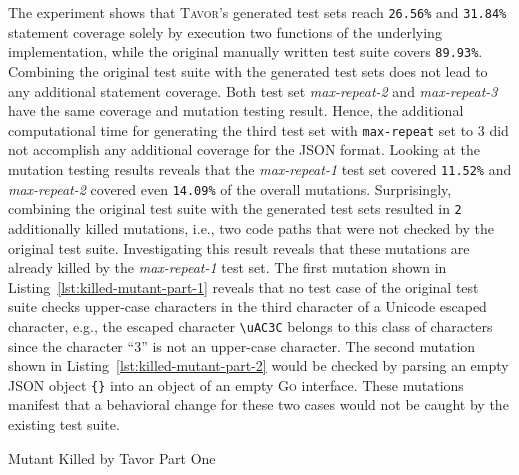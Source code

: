 The experiment shows that \textsc{Tavor}'s generated test sets reach \texttt{26.56\%} and \texttt{31.84\%} statement coverage solely by execution two functions of the underlying implementation, while the original manually written test suite covers \texttt{89.93\%}. Combining the original test suite with the generated test sets does not lead to any additional statement coverage. Both test set \emph{max-repeat-2} and \emph{max-repeat-3} have the same coverage and mutation testing result. Hence, the additional computational time for generating the third test set with \texttt{max-repeat} set to 3 did not accomplish any additional coverage for the JSON format. Looking at the mutation testing results reveals that the \emph{max-repeat-1} test set covered \texttt{11.52\%} and \emph{max-repeat-2} covered even \texttt{14.09\%} of the overall mutations. Surprisingly, combining the original test suite with the generated test sets resulted in \texttt{2} additionally killed mutations, i.e., two code paths that were not checked by the original test suite. Investigating this result reveals that these mutations are already killed by the \emph{max-repeat-1} test set. The first mutation shown in Listing~\ref{lst:killed-mutant-part-1} reveals that no test case of the original test suite checks upper-case characters in the third character of a Unicode escaped character, e.g., the escaped character \texttt{\textbackslash{}uAC3C} belongs to this class of characters since the character \enquote{3} is not an upper-case character. The second mutation shown in Listing~\ref{lst:killed-mutant-part-2} would be checked by parsing an empty JSON object \texttt{\{\}} into an object of an empty \textsc{Go} interface. These mutations manifest that a behavioral change for these two cases would not be caught by the existing test suite.

\begin{listing}[H]
\caption{Mutant Killed by Tavor Part One}
\label{lst:killed-mutant-part-1}
\begin{textcode}
--- /home/symflower/json/json/original/src/json/scanner.go  2017-12-01 18:53:42.663580118 +0100
+++ /tmp/go-mutesting-288106446//home/symflower/json/json/original/src/json/scanner.go.119  2017-12-03 10:43:45.026538957 +0100
@@ -378,7 +378,7 @@
 // stateInStringEscU12 is the state after reading `"\u12` during a quoted string.
 func stateInStringEscU12(s *scanner, c byte) int {
- if '0' <= c && c <= '9' || 'a' <= c && c <= 'f' || 'A' <= c && c <= 'F' {
+ if '0' <= c && c <= '9' || 'a' <= c && c <= 'f' || false {
    s.step = stateInStringEscU123
    return scanContinue
  }
FAIL "/tmp/go-mutesting-288106446//home/symflower/json/json/original/src/json/scanner.go.119" with checksum 3b91ecf37738b985eb6fa9a64bb9fcf9
\end{textcode}
\end{listing}


